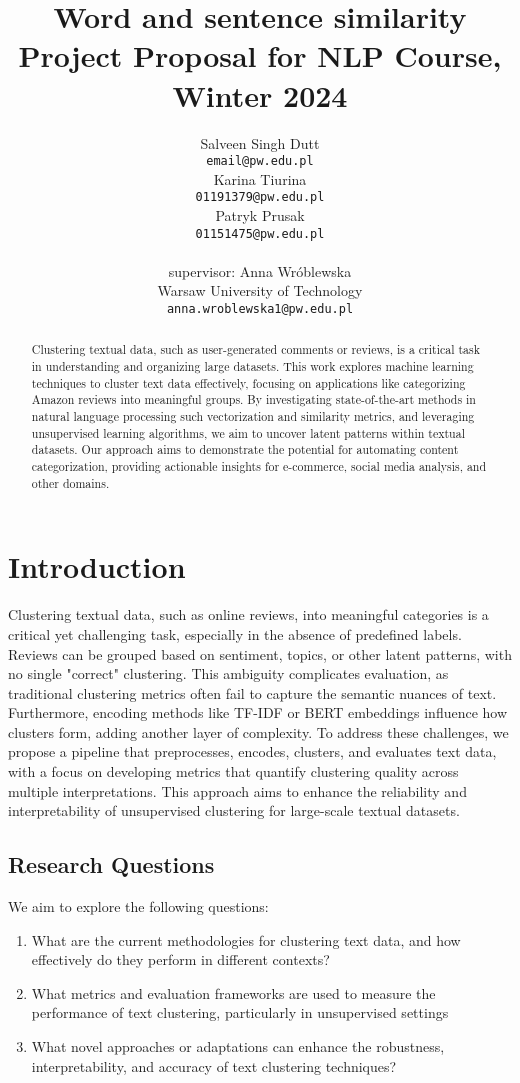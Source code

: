 \documentclass[11pt]{article}
\title{Word and sentence similarity\\Project Proposal for NLP Course, Winter 2024}
\author{Salveen Singh Dutt \\
  {\tt email@pw.edu.pl} \\\And
  Karina Tiurina \\
  {\tt 01191379@pw.edu.pl} \\ \And 
  Patryk Prusak \\
  {\tt 01151475@pw.edu.pl} \\ \\ 
  supervisor: Anna Wróblewska\\
  Warsaw University of Technology \\
  {\tt anna.wroblewska1@pw.edu.pl}}
\date{}
\begin{document}
\maketitle
\begin{abstract}
    Clustering textual data, such as user-generated comments or reviews, is a critical task in understanding and organizing large datasets. This work explores machine learning techniques to cluster text data effectively, focusing on applications like categorizing Amazon reviews into meaningful groups. By investigating state-of-the-art methods in natural language processing such vectorization and similarity metrics, and leveraging unsupervised learning algorithms, we aim to uncover latent patterns within textual datasets. Our approach aims to demonstrate the potential for automating content categorization, providing actionable insights for e-commerce, social media analysis, and other domains.
\end{abstract}

\section{Introduction}
    Clustering textual data, such as online reviews, into meaningful categories is a critical yet challenging task, especially in the absence of predefined labels. Reviews can be grouped based on sentiment, topics, or other latent patterns, with no single "correct" clustering. This ambiguity complicates evaluation, as traditional clustering metrics often fail to capture the semantic nuances of text. Furthermore, encoding methods like TF-IDF or BERT embeddings influence how clusters form, adding another layer of complexity. To address these challenges, we propose a pipeline that preprocesses, encodes, clusters, and evaluates text data, with a focus on developing metrics that quantify clustering quality across multiple interpretations. This approach aims to enhance the reliability and interpretability of unsupervised clustering for large-scale textual datasets.

\subsection{Research Questions}
We aim to explore the following questions:
\begin{enumerate}
    \item What are the current methodologies for clustering text data, and how effectively do they perform in different contexts?
    \item What metrics and evaluation frameworks are used to measure the performance of text clustering, particularly in unsupervised settings
    \item What novel approaches or adaptations can enhance the robustness, interpretability, and accuracy of text clustering techniques?
\end{enumerate}
\end{document}
